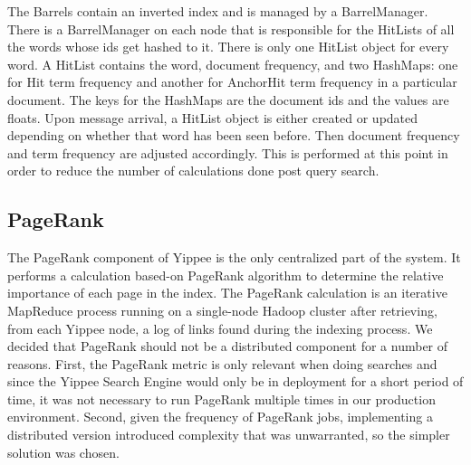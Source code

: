 \documentclass[11pt, letterpaper, oneside, twocolumn]{article}
\begin{document}
The Barrels contain an inverted index and is managed by a BarrelManager. 
There is a BarrelManager on each node that is responsible for the HitLists of all the words whose ids get hashed to it. There is only one HitList object for every word. 
A HitList contains the word, document frequency, and two HashMaps: one for Hit term frequency and another for AnchorHit term frequency in a particular document. 
The keys for the HashMaps are the document ids and the values are floats. 
Upon message arrival, a HitList object is either created or updated depending on whether that word has been seen before. 
Then document frequency and term frequency are adjusted accordingly. 
This is performed at this point in order to reduce the number of calculations done post query search.  

\subsection{PageRank}

The PageRank component of Yippee is the only centralized part of the system.
It performs a calculation based-on PageRank algorithm\cite{pagerank} to determine the relative importance of each page in the index.
The PageRank calculation is an iterative MapReduce process running on a single-node Hadoop cluster after retrieving, from each Yippee node, a log of links found during the indexing process.
We decided that PageRank should not be a distributed component for a number of  reasons. 
First, the PageRank metric is only relevant when doing searches and since the Yippee Search Engine would only be in deployment for a short period of time, it was not necessary to run PageRank multiple times in our production environment.
Second, given the frequency of PageRank jobs, implementing a distributed version introduced complexity that was unwarranted, so the simpler solution was chosen.
\end{document}

